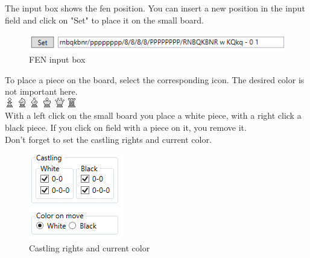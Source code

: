 \documentclass[11pt,a4paper]{article}
\begin{document}
The input box shows the fen position. You can insert a new position in the input field and click on "Set" to place it on the small board.

\begin{figure}[H]
	\centering
	\includegraphics[scale=0.55]{SetupPosition3.png}
	\caption{FEN input box}
	\label{fig:SetupPosition3}
\end{figure}

To place a piece on the board, select the corresponding icon. The desired color is not important here.\\
\includegraphics[scale=1]{WhiteP.png} \includegraphics[scale=1]{WhiteN.png} 
\includegraphics[scale=1]{WhiteB.png} \includegraphics[scale=1]{WhiteK.png}
\includegraphics[scale=1]{WhiteQ.png} \includegraphics[scale=1]{WhiteR.png}\\

With a left click on the small board you place a white piece, with a right click a black piece.
If you click on field with a piece on it, you remove it.\\
Don't forget to set the castling rights and current color.

\begin{figure}[H]
	\centering
	\includegraphics[scale=1.0]{castling.png}
	\caption{Castling rights and current color}
	\label{fig:castling}
\end{figure}
\end{document}
